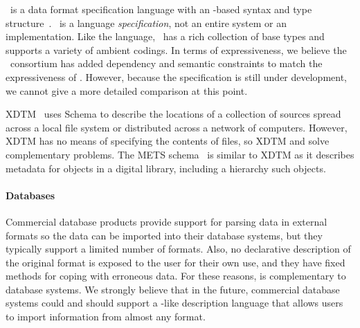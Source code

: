 \dfdl\ is a data format specification language with an \xml-based syntax
and type structure~\cite{dfdl-proposal,dfdl-primer}. \dfdl\ is a
language \textit{specification}, not an entire system or an
implementation.  Like the \padsml{} language, \dfdl\ has a rich
collection of base types and supports a variety of ambient codings.
In terms of expressiveness, we believe the \dfdl\ consortium has added
dependency and semantic constraints to match the expressiveness of
\padsc{}.  However, because the specification is still under
development, we cannot give a more detailed comparison at this point.


XDTM~\cite{xdtm,zhao+:sigmod05} uses \xml{} Schema to describe the
locations of a collection of sources spread across a local file system
or distributed across a network of computers.  However, XDTM has no
means of specifying the contents of files, so XDTM and \padsml{} solve
complementary problems.  The METS schema~\cite{mets} is similar to XDTM as
it describes metadata for objects in a digital library, including a
hierarchy such objects.

\paragraph*{Databases}
Commercial database products provide support for
parsing data in external formats so the data can be imported into
their database systems, but they typically support a limited number of
formats.  Also, no declarative description of the
original format is exposed to the user for their own use, and they
have fixed methods for coping with erroneous data.  For these reasons,
\padsml{} is complementary to database systems.  We strongly believe that
in the future, commercial database systems could and should support a 
\pads{}-like description language that allows users to import information from
almost any format.

